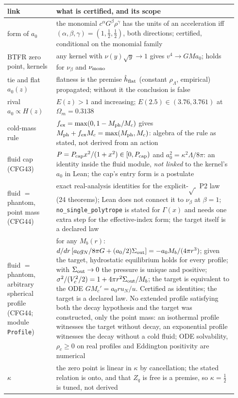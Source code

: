 \documentclass[10pt]{article}
\begin{document}
\begin{center}\small
\begin{tabular}{p{0.20\linewidth}p{0.74\linewidth}}
\toprule
link & what is certified, and its scope \\
\midrule
form of $a_0$ & the monomial $c^\alpha G^\beta\rho^\gamma$ has the units of an acceleration iff $(\alpha,\beta,\gamma)=(1,\tfrac12,\tfrac12)$, both directions; certified, conditional on the monomial family \\
BTFR zero point, kernels & any kernel with $\nu(y)\sqrt y\to1$ gives $v^4\to GMa_0$; holds for $\nu_\beta$ and $\nu_{\rm mono}$ \\
tie and flat $a_0(z)$ & flatness is the premise $\hat h_{\rm flat}$ (constant $\rho_\Lambda$, empirical) propagated; without it the conclusion is false \\
rival $a_0\propto H(z)$ & $E(z)>1$ and increasing; $E(2.5)\in(3.76,3.761)$ at $\Omega_m=0.3138$ \\
cold-mass rule & $f_{\rm ex}=\max(0,1-M_{\rm ph}/M_c)$ gives $M_{\rm ph}+f_{\rm ex}M_c=\max(M_{\rm ph},M_c)$: algebra of the rule as stated, not derived from an action \\
fluid cap (CFG43) & $P=P_{\rm cap}x^2/(1+x^2)\in[0,P_{\rm cap})$ and $a_0^2=\kappa^2\Lambda/8\pi$: an identity inside the fluid module, \emph{not linked} to the kernel's $a_0$ in Lean; the cap's entry form is a postulate \\
fluid $=$ phantom, point mass (CFG44) & exact real-analysis identities for the explicit-$\sqrt{\ }$ P2 law (24 theorems); Lean does not connect it to $\nu_\beta$ at $\beta=1$; \texttt{no\_single\_polytrope} is stated for $\Gamma(x)$ and needs one extra step for the effective-index form; the target itself is a declared law \\
fluid $=$ phantom, arbitrary spherical profile (CFG44; module \texttt{Profile}) & for any $M_b(r)$: $d/dr\,[a_0 g_N/8\pi G+(a_0/2)\Sigma_{\rm out}]=-a_0M_b/(4\pi r^3)$; given the target, hydrostatic equilibrium holds for every profile; with $\Sigma_{\rm out}\to0$ the pressure is unique and positive; $\sigma^2/(V_c^2/2)=1+4\pi r^2\Sigma_{\rm out}/M_b$; the target is equivalent to the ODE $GM_c'=a_0 r u_N/u$. Certified as identities; the target is a declared law. No extended profile satisfying both the decay hypothesis and the target was constructed, only the point mass: an isothermal profile witnesses the target without decay, an exponential profile witnesses the decay without a cold fluid; ODE solvability, $\rho_c\ge0$ on real profiles and Eddington positivity are numerical \\
$\kappa$ & the zero point is linear in $\kappa$ by cancellation; the stated relation is onto, and that $Z_q$ is free is a premise, so $\kappa=\tfrac12$ is tuned, not derived \\
\bottomrule
\end{tabular}
\end{center}
\end{document}

